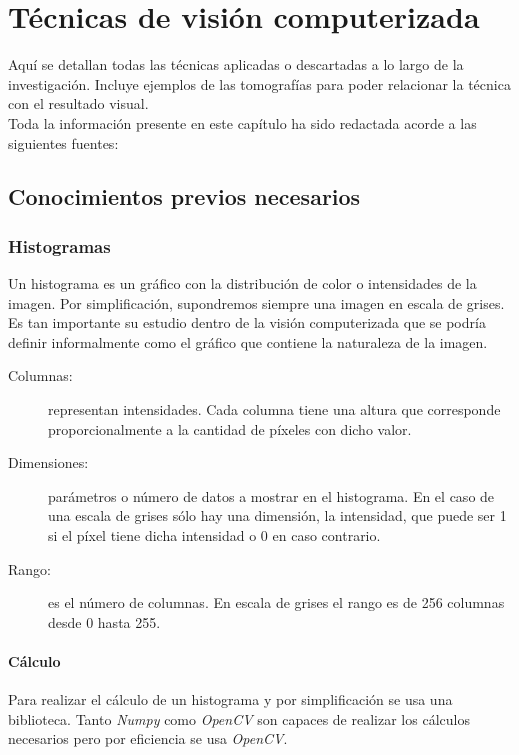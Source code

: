 \chapter{Técnicas de visión computerizada}
Aquí se detallan todas las técnicas aplicadas o descartadas a lo largo
de la investigación. Incluye ejemplos de las tomografías para poder
relacionar la técnica con el resultado visual.\\
Toda la información presente en este capítulo ha sido redactada acorde
a las siguientes fuentes:

\section{Conocimientos previos necesarios}

\subsection{Histogramas}
Un histograma es un gráfico con la distribución de color o
intensidades de la imagen. Por simplificación, supondremos siempre una
imagen en escala de grises. Es tan importante su estudio dentro de la
visión computerizada que se podría definir informalmente como el
gráfico que contiene la naturaleza de la imagen.
\begin{description}
\item[Columnas:] representan intensidades. Cada columna tiene una
  altura que corresponde proporcionalmente a la cantidad de píxeles
  con dicho valor.
\item[Dimensiones:] parámetros o número de datos a mostrar en el
  histograma. En el caso de una escala de grises sólo hay una
  dimensión, la intensidad, que puede ser 1 si el píxel tiene dicha
  intensidad o 0 en caso contrario.
\item[Rango:] es el número de columnas. En escala de grises el rango
  es de 256 columnas desde 0 hasta 255.
\end{description}

\subsubsection{Cálculo}
Para realizar el cálculo de un histograma y por simplificación se usa
una biblioteca. Tanto \emph{Numpy} como \emph{OpenCV} son capaces de
realizar los cálculos necesarios pero por eficiencia se usa
\emph{OpenCV}.

